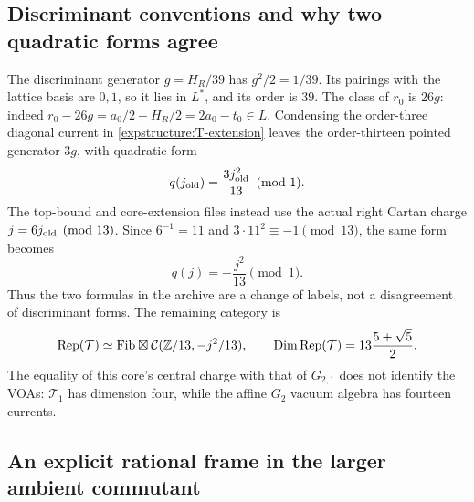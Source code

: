 \subsection{Discriminant conventions and why two quadratic forms agree}

The discriminant generator $g=H_R/39$ has
$g^2/2=1/39$. Its pairings with the lattice basis are $0,1$, so it
lies in $L^*$, and its order is $39$. The class of $r_0$ is $26g$:
indeed $r_0-26g=a_0/2-H_R/2=2a_0-t_0\in L$.
Condensing the order-three diagonal current in
\eqref{expstructure:T-extension} leaves the order-thirteen pointed
generator $3g$, with quadratic form
\[
 q(j_{\rm old})=\frac{3j_{\rm old}^2}{13}\pmod1.
\]
The top-bound and core-extension files instead use the actual right
Cartan charge $j=6j_{\rm old}\pmod{13}$. Since $6^{-1}=11$ and
$3\cdot11^2\equiv-1\pmod{13}$, the same form becomes
\[
 q(j)=-\frac{j^2}{13}\pmod1.
\]
Thus the two formulas in the archive are a change of labels, not a
disagreement of discriminant forms. The remaining category is
\[
 \operatorname{Rep}(\mathcal T)\simeq
 \mathrm{Fib}\boxtimes\mathcal C(\mathbb Z/13,-j^2/13),
 \qquad
 \operatorname{Dim}\operatorname{Rep}(\mathcal T)
 =13\frac{5+\sqrt5}{2}.
\]
The equality of this core's central charge with that of $G_{2,1}$
does not identify the VOAs: $\mathcal T_1$ has dimension four, while
the affine $G_2$ vacuum algebra has fourteen currents.

\subsection{An explicit rational frame in the larger ambient commutant}
\label{expstructure:ambient26}

